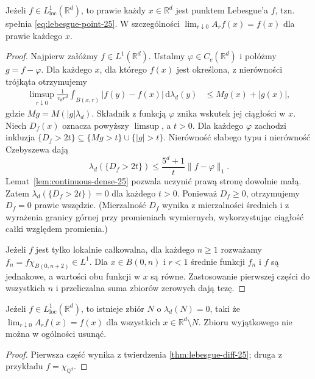 \begin{twierdzenie}
\label{thm:lebesgue-diff-25}
Jeżeli $f\in L^1_{\mathrm{loc}}(\mathbb R^d)$, to
prawie każdy $x\in\mathbb R^d$ jest punktem Lebesgue'a
$f$, tzn. spełnia \eqref{eq:lebesgue-point-25}.
W szczególności
$\lim_{r\downarrow0}A_rf(x)=f(x)$ dla prawie każdego $x$.
\end{twierdzenie}
\begin{proof}
Najpierw załóżmy $f\in L^1(\mathbb R^d)$. Ustalmy
$\varphi\in C_c(\mathbb R^d)$ i połóżmy $g=f-\varphi$.
Dla każdego $x$, dla którego $f(x)$ jest określona,
z nierówności trójkąta otrzymujemy
\begin{align*}
 \limsup_{r\downarrow0}\frac1{v_dr^d}
 \int_{B(x,r)}|f(y)-f(x)|\,\mathrm d\lambda_d(y)
 &\le Mg(x)+|g(x)|,
\end{align*}
gdzie $Mg=M(|g|\lambda_d)$. Składnik z funkcją
$\varphi$ znika wskutek jej ciągłości w $x$.
Niech $D_f(x)$ oznacza powyższy $\limsup$, a $t>0$.
Dla każdego $\varphi$ zachodzi inkluzja
$\{D_f>2t\}\subseteq\{Mg>t\}\cup\{|g|>t\}$.
Nierówność słabego typu i nierówność Czebyszewa dają
\[
 \lambda_d(\{D_f>2t\})
 \le\frac{5^d+1}{t}\|f-\varphi\|_1.
\]
Lemat~\ref{lem:continuous-dense-25} pozwala uczynić
prawą stronę dowolnie małą. Zatem
$\lambda_d(\{D_f>2t\})=0$ dla każdego $t>0$.
Ponieważ $D_f\ge0$, otrzymujemy $D_f=0$ prawie
wszędzie. (Mierzalność $D_f$ wynika z mierzalności
średnich i z wyrażenia granicy górnej przy promieniach
wymiernych, wykorzystując ciągłość całki względem
promienia.)

Jeżeli $f$ jest tylko lokalnie całkowalna, dla każdego
$n\ge1$ rozważamy $f_n=f\chi_{B(0,n+2)}\in L^1$.
Dla $x\in B(0,n)$ i $r<1$ średnie funkcji
$f_n$ i $f$ są jednakowe, a wartości obu funkcji
w $x$ są równe. Zastosowanie pierwszej części do
wszystkich $n$ i przeliczalna suma zbiorów zerowych
dają tezę.
\end{proof}

\begin{wniosek}
\label{cor:diff-basis-25}
Jeżeli $f\in L^1_{\mathrm{loc}}(\mathbb R^d)$,
to istnieje zbiór $N$ o $\lambda_d(N)=0$, taki że
$\lim_{r\downarrow0}A_rf(x)=f(x)$ dla wszystkich
$x\in\mathbb R^d\setminus N$. Zbioru wyjątkowego
nie można w ogólności usunąć.
\end{wniosek}
\begin{proof}
Pierwsza część wynika z twierdzenia
\ref{thm:lebesgue-diff-25}; druga z przykładu
$f=\chi_{\mathbb Q^d}$.
\end{proof}

